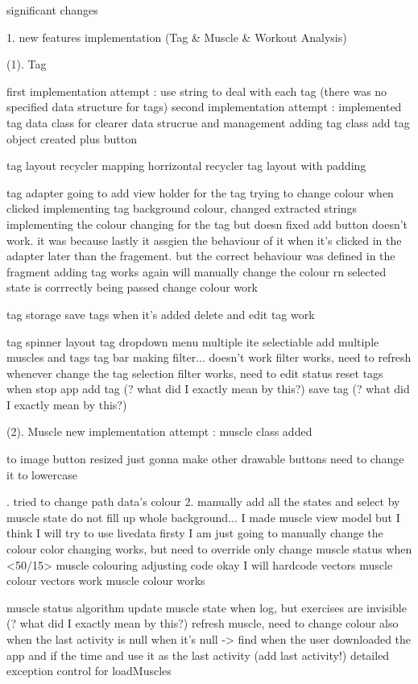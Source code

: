
significant changes 

1. new features implementation (Tag & Muscle & Workout Analysis)

(1). Tag

first implementation attempt : use string to deal with each tag (there was no specified data structure for tags)
second implementation attempt : implemented tag data class for clearer data strucrue and management 
    adding tag class
    add tag object created
    plus button

\view
tag layout
recycler mapping
horrizontal recycler
tag layout with padding

\viewModel
tag adapter
going to add view holder for the tag
trying to change colour when clicked
implementing tag background colour, changed extracted strings
implementing the colour changing for the tag but doesn
fixed add button doesn't work. it was because lastly it assgien the behaviour of it when it's clicked in the adapter later than the fragement. but the correct behaviour was defined in the fragment
adding tag works again
will manually change the colour rn
selected state is corrrectly being passed
change colour work

\model
tag storage
save tags when it's added
delete and edit tag work

\addCardActivity
tag spinner layout 
tag dropdown menu
    multiple ite selectiable
    add multiple muscles and tags
\homeFragment\statusFragment
tag bar
    making filter... doesn't work
    filter works, need to refresh whenever change the tag selection
    filter works, need to edit status
    reset tags when stop app
    add tag (? what did I exactly mean by this?)
    save tag (? what did I exactly mean by this?)


(2). Muscle
new implementation attempt : muscle class added

\view
to image button
resized
just gonna make other drawable buttons
need to change it to lowercase

. tried to change path data's colour
2. manually add all the states and select by muscle state
do not fill up whole background...
I made muscle view model but I think I will try to use livedata firsty
I am just going to manually change the colour
color changing works, but need to override
only change muscle status when <50/15>
muscle colouring
adjusting code
okay I will hardcode
vectors
muscle colour vectors
work
muscle colour works

\model
muscle status algorithm
update muscle state when log, but exercises are invisible (? what did I exactly mean by this?)
refresh muscle, need to change colour also when the last activity is null
when it's null -> find when the user downloaded the app and if the time and use it as the last activity (add last activity!)
detailed exception control for loadMuscles

